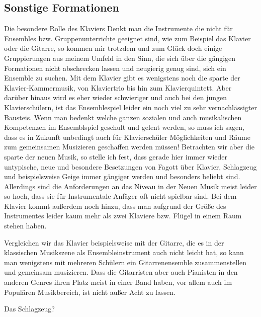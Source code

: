 \subsection{Sonstige Formationen}
Die besondere Rolle des Klaviers Denkt man die Instrumente die nicht für
Ensembles bzw. Gruppenunterrichte geeignet sind, wie zum Beispiel das Klavier
oder die Gitarre, so kommen mir trotzdem und zum Glück doch einige Gruppierungen
aus meinem Umfeld in den Sinn, die sich über die gängigen Formationen nicht
abschrecken lassen und neugierig genug sind, sich ein Ensemble zu suchen. Mit
dem Klavier gibt es wenigstens noch die sparte der Klavier-Kammermusik, von
Klaviertrio bis hin zum Klavierquintett. Aber darüber hinaus wird es eher wieder
schwieriger und auch bei den jungen Klavierschülern, ist das Ensemblespiel
leider ein noch viel zu sehr vernachlässigter Bausteis. Wenn man bedenkt welche
ganzen sozialen und auch musikalischen Kompetenzen im Ensemblspiel geschult und
gelent werden, so muss ich sagen, dass es in Zukunft unbedingt auch für
Klavierschüler Möglichkeiten und Räume zum gemeinsamen Musizieren geschaffen
werden müssen! Betrachten wir aber die sparte der neuen Musik, so stelle ich
fest, dass gerade hier immer wieder untypische, neue und besondere Besetzungen
von Fagott über Klavier, Schlagzeug und beispielsweise Geige immer gängiger
werden und besonders beliebt sind. Allerdings sind die Anforderungen an das
Niveau in der Neuen Musik meist leider so hoch, dass sie für Instrumentale
Anfäger oft nicht spielbar sind. Bei dem Klavier kommt außerdem noch hinzu, dass
man aufgrund der Größe des Instrumentes leider kaum mehr als zwei Klaviere bzw.
Flügel in einem Raum stehen haben. 

Vergleichen wir das Klavier beispielsweise mit der Gitarre, die es in der
klassischen Musikszene als Ensembleinstrument auch nicht leicht hat, so kann man
wenigstens mit mehreren Schülern ein Gitarrenensemble zusammenstellen und
gemeinsam musizieren. Dass die Gitarristen aber auch Pianisten in den anderen
Genres ihren Platz meist in einer Band haben, vor allem auch im Populären
Musikbereich, ist nicht außer Acht zu lassen. 

Das Schlagzeug?





